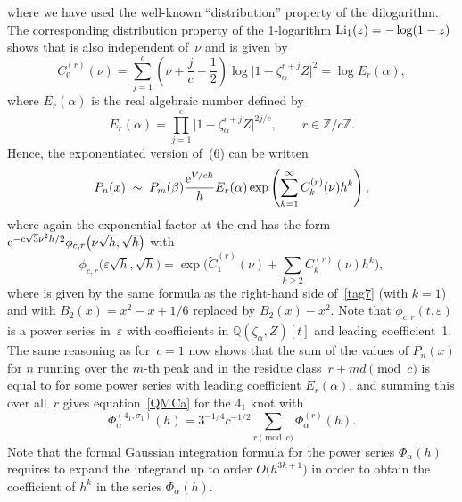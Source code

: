 \documentclass[pdftex]{sigma}
\numberwithin{equation}{section}
\def\z{\zeta}
\def\a{\alpha}
\def\Z{\mathbb Z}
\def\Q{\mathbb Q}
\def\m{ - }
\def\si{\;\sim\;}
\def\hb{\hbar}
\def\a{\alpha}
\def\b{\beta}
\def\z{\zeta}
\def\s{\sigma}
\def\v{\varepsilon}
\def\L{\text{{\rm Li}}}
\begin{document}
where we have used the well-known ``distribution'' property of the
dilogarithm. The corresponding distribution property
of the 1-logarithm $\L_1(z)=-\log(1-z)$ shows that  is also
independent of~$\nu$ and is given by
\[
C_0^{(r)}(\nu) = \sum_{j=1}^c \left(\nu+\frac jc-\frac12\right)
\log\bigl|1\m\z_\a^{r+j}Z\bigr|^2 = \log E_r(\a) ,
\]
where $E_r(\a)$ is the real algebraic number defined by
\begin{equation}
\label{tag8}
E_r(\a) = \prod_{j=1}^c \bigl|1\m\z_\a^{r+j}Z\bigr|^{2j/c},
\qquad r\in\Z/c\Z .
\end{equation}
Hence, the exponentiated version of~(6) can be written
\[
P_n(x) \si P_m(\b) \frac{{\rm e}^{V/c\hb}}\hb E_r(\a)
\exp\left(\sum_{k=1}^\infty C_k^{(r)}(\nu) h^k\right) ,
\]
where again the exponential factor at the end has the form
${\rm e}^{-c\sqrt 3\nu^2h/2}\phi_{c,r}\big(\nu\sqrt h,\sqrt h\big)$ with
\[%
\phi_{c,r}\big(\v\sqrt h,\sqrt h\big)=
\exp\biggl(
\widetilde C_1^{(r)}(\nu) +
\sum_{k \geq 2} C_k^{(r)}(\nu) h^k
\biggr),
\]
where  is given by the same formula
as the right-hand side of~\eqref{tag7} (with $k=1$) and with
$B_2(x)=x^2-x+1/6$ replaced by $B_2(x)-x^2$. Note that $\phi_{c,r}(t,\v)$
is a power series in~$\v$ with coefficients in $\Q(\z_\a,Z)[t]$ and
leading coefficient~1.
The same reasoning as for~$c=1$ now shows that the sum of the values of
$P_n(x)$ for $n$ running over the $m$-th peak and in the residue
class~$r+md\!\pmod c$ is equal to \smash{$\hb^{-3/2} {\rm e}^{V/c\hb} P_m(\b)
\Phi_\a^{(r)}(h)$} for some power series  with leading
coefficient $E_r(\a)$, and summing this over all~$r$ gives
equation~\eqref{QMCa} for the $4_1$ knot with
\[%
\Phi^{(4_1,\s_1)}_\a(h)=3^{-1/4}c^{-1/2} \sum_{r\!\!\!\!\pmod c}\Phi_\a^{(r)}(h) .
\]
Note that the formal Gaussian integration formula for
the power series $\Phi_\a(h)$ requires to expand the integrand up to
order $O\big(h^{3k+1}\big)$ in order to obtain the coefficient of $h^k$ in the
series $\Phi_\a(h)$.
\end{document}
